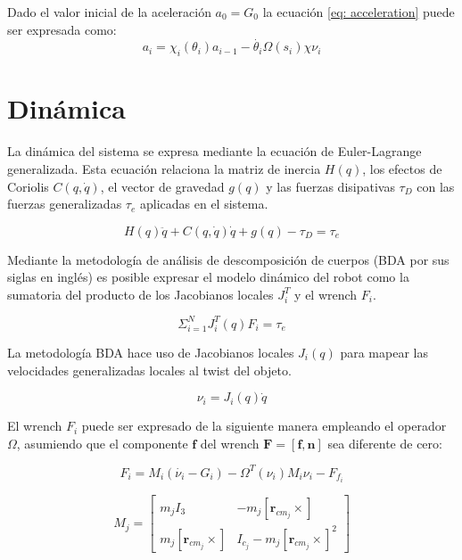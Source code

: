 Dado el valor inicial de la aceleración 
$a_0 = G_0$ 
la ecuación \eqref{eq: acceleration} 
puede ser expresada como:
\begin{equation}
a_i = \chi_i(\theta_i) a_{i-1} - \dot{\theta_i}\Omega(s_i)\chi \nu_i
\end{equation}

\section{Dinámica}

La dinámica del sistema se expresa mediante la ecuación 
de Euler-Lagrange generalizada. 
Esta ecuación relaciona la matriz de inercia $H(q)$,
los efectos de Coriolis $C(q,\dot q)$, el vector de
gravedad $g(q)$ y las fuerzas disipativas $\tau_D$ con 
las fuerzas generalizadas $\tau_e$ aplicadas en el sistema.

\begin{equation}\label{eq: lagrangiano_modelo}
H(q)\ddot{q} + C(q,\dot{q})\dot{q} +g(q) - \tau_D = \tau_e
\end{equation}

Mediante la metodología de 
análisis de descomposición de cuerpos 
(BDA por sus siglas en inglés) \cite{olguin2019multibody} 
es posible expresar
el modelo dinámico del robot como la sumatoria 
del producto de los Jacobianos locales 
$J_i^T$ y el wrench $F_i$.

\begin{equation}
\Sigma_{i=1}^N J_i^T(q)F_i = \tau_e
\end{equation}

La metodología BDA hace uso de Jacobianos locales $J_i(q)$
para mapear las velocidades generalizadas locales 
al twist del objeto.

\begin{equation} \label{eq: twist_loc}
\nu_i = J_i(q)\dot{q}
\end{equation}

El wrench $F_i$ puede ser expresado de la siguiente 
manera empleando el operador $\Omega$, asumiendo que el 
componente $\mathbf f$ del wrench $\mathbf F = [\mathbf f, \mathbf n]$ sea diferente de cero:

\begin{equation}
F_i = M_i(\dot{\nu_i} - G_i) - \Omega^T(\nu_i)M_i\nu_i - F_{f_{i}}
\end{equation}

\begin{equation}
 M_j = \begin{bmatrix}
        m_j I_3 & -m_j [\mathbf r_{cm_j} \times]\\
        m_j [\mathbf r_{cm_j} \times] & I_{c_j} -m_j [\mathbf r_{cm_j} \times]^2
       \end{bmatrix}
\end{equation}


